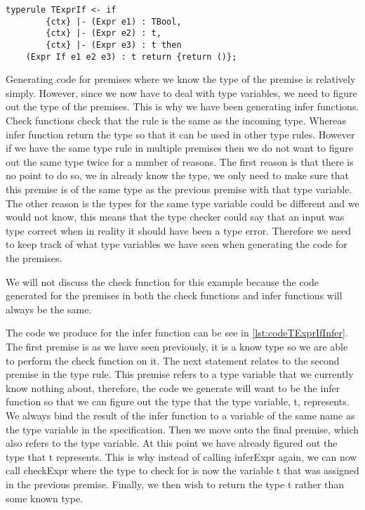 \begin{lstlisting}[caption = Type rule for if expression expression involving type variables, label=lst:jetSTLCIfExpr]
typerule TExprIf <- if 
        {ctx} |- (Expr e1) : TBool, 
        {ctx} |- (Expr e2) : t, 
        {ctx} |- (Expr e3) : t then 
    (Expr If e1 e2 e3) : t return {return ()};
\end{lstlisting}

Generating code for premises where we know the type of the premise is relatively simply.
However, since we now have to deal with type variables, we need to figure out the type of the premises. 
This is why we have been generating infer functions.
Check functions check that the rule is the same as the incoming type.
Whereas infer function return the type so that it can be used in other type rules.
However if we have the same type rule in multiple premises then we do not want to figure out the same type twice for a number of reasons.
The first reason is that there is no point to do so, we in already know the type, we only need to make sure that this premise is of the same type as the previous premise with that type variable.
The other reason is the types for the same type variable could be different and we would not know, this means that the type checker could say that an input was type correct when in reality it should have been a type error.
Therefore we need to keep track of what type variables we have seen when generating the code for the premises.

We will not discuss the check function for this example because the code generated for the premises in both the check functions and infer functions will always be the same.

The code we produce for the infer function can be see in \autoref{lst:codeTExprIfInfer}.
The first premise is as we have seen previously, it is a know type so we are able to perform the check function on it.
The next statement relates to the second premise in the type rule.
This premise refers to a type variable that we currently know nothing about, therefore, the code we generate will want to be the infer function so that we can figure out the type that the type variable, t, represents.
We always bind the result of the infer function to a variable of the same name as the type variable in the specification.
Then we move onto the final premise, which also refers to the type variable.
At this point we have already figured out the type that t represents.
This is why instead of calling inferExpr again, we can now call checkExpr where the type to check for is now the variable t that was assigned in the previous premise.
Finally, we then wish to return the type t rather than some known type.

